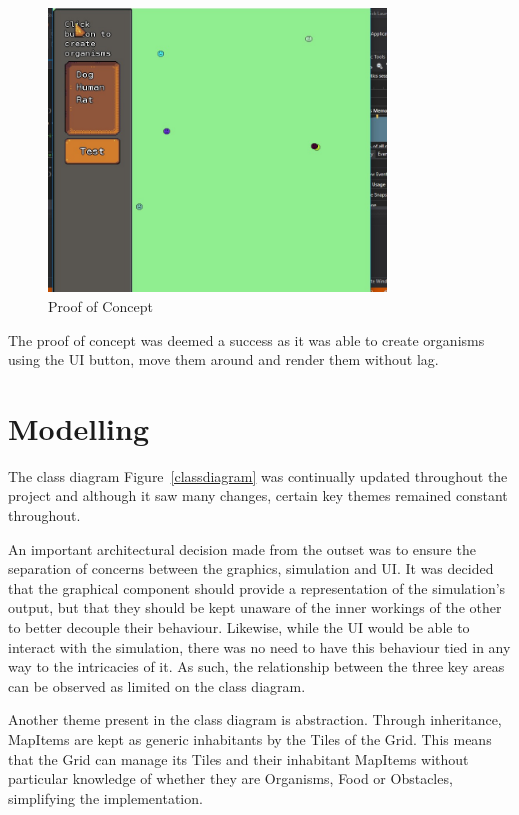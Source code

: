 \documentclass[a4paper, oneside, 11pt]{report}
\begin{document}
\begin{figure}[H]
	\caption{Proof of Concept}\label{poc}
	\centering
	\includegraphics[width=0.8\textwidth]{poc}
\end{figure}

The proof of concept was deemed a success as it was able to create organisms using the UI button, move them around and render them without lag.
\section{Modelling}
The class diagram Figure~\ref{classdiagram} was continually updated throughout the project and although it saw many changes, certain key themes remained constant throughout.

An important architectural decision made from the outset was to ensure the separation of concerns between the graphics, simulation and UI. It was decided that the graphical component should provide a representation of the simulation's output, but that they should be kept unaware of the inner workings of the other to better decouple their behaviour. Likewise, while the UI would be able to interact with the simulation, there was no need to have this behaviour tied in any way to the intricacies of it. As such, the relationship between the three key areas can be observed as limited on the class diagram.

Another theme present in the class diagram is abstraction. Through inheritance, MapItems are kept as generic inhabitants by the Tiles of the Grid. This means that the Grid can manage its Tiles and their inhabitant MapItems without particular knowledge of whether they are Organisms, Food or Obstacles, simplifying the implementation.
\end{document}
